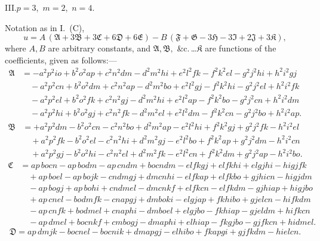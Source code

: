 \documentclass[11pt]{article}
\newcommand{\fA}{\mathfrak{A}}
\newcommand{\fB}{\mathfrak{B}}
\newcommand{\fC}{\mathfrak{C}}
\newcommand{\fD}{\mathfrak{D}}
\newcommand{\fE}{\mathfrak{E}}
\newcommand{\fF}{\mathfrak{F}}
\newcommand{\fG}{\mathfrak{G}}
\newcommand{\fH}{\mathfrak{H}}
\newcommand{\fI}{\mathfrak{I}}
\newcommand{\fJ}{\mathfrak{J}}
\newcommand{\fK}{\mathfrak{K}}
\begin{document}
\bigskip
III.\quad $p=3$,\ $m=2$,\ $n=4$.

Notation as in I.~(C),
\[
u = A\,(\fA + 3\fB + 3\fC + 6\fD + 6\fE) - B\,(\fF + \fG - 3\fH - 3\fI + 2\fJ + 3\fK),
\]
where $A, B$ are arbitrary constants, and $\fA, \fB,$ \&c.\,\ldots $\fK$ are functions of the coefficients,
given as follows:---
\[
\begin{aligned}
\fA &= -a^2 p^2 io + b^2 o^2 ap + c^2 n^2 dm - d^2 m^2 hi + e^2 l^2 fk - f^2 k^2 el - g^2 j^2 hi + h^2 i^2 gj\\
&\quad - a^2 p^2 cn + b^2 o^2 dm + c^2 n^2 ap - d^2 m^2 bo + e^2 l^2 gj - f^2 k^2 hi - g^2 j^2 el + h^2 i^2 fk\\
&\quad - a^2 p^2 el + b^2 o^2 fk + c^2 n^2 gj - d^2 m^2 hi + e^2 l^2 ap - f^2 k^2 bo - g^2 j^2 cn + h^2 i^2 dm\\
&\quad - a^2 p^2 hi + b^2 o^2 gj + c^2 n^2 fk - d^2 m^2 el + e^2 l^2 dm - f^2 k^2 cn - g^2 j^2 bo + h^2 i^2 ap.
\end{aligned}
\]
\[
\begin{aligned}
\fB &= +a^2 p^2 dm - b^2 o^2 cn - c^2 n^2 bo + d^2 m^2 ap - e^2 l^2 hi + f^2 k^2 gj + g^2 j^2 fk - h^2 i^2 el\\
&\quad + a^2 p^2 fk - b^2 o^2 el - c^2 n^2 hi + d^2 m^2 gj - e^2 l^2 bo + f^2 k^2 ap + g^2 j^2 dm - h^2 i^2 cn\\
&\quad + a^2 p^2 gj - b^2 o^2 hi - c^2 n^2 el + d^2 m^2 fk - e^2 l^2 cn + f^2 k^2 dm + g^2 j^2 ap - h^2 i^2 bo.
\end{aligned}
\]
\[
\begin{aligned}
\fC &= ap\,bocn - ap\,bodm - ap\,cndm + bocndm - elfkgj + elfkhi + elgjhi - higjfk\\
&\quad + ap\,boel - ap\,bojk - cndmgj + dmcnhi - elfkap + elfkbo + gjhicn - higjdm\\
&\quad - ap\,bogj + ap\,bohi + cndmel - dmcnkf + elfkcn - elfkdm - gjhiap + higjbo\\
&\quad + ap\,cnel - bodmfk - cnapgj + dmboki - elgjap + fkhibo + gjelcn - hifkdm\\
&\quad - ap\,cnfk + bodmel + cnaphi - dmboel + elgjbo - fkhiap - gjeldm + hifkcn\\
&\quad - ap\,dmel + bocnkf + cmbogj - dmaphi + elhiap - fkgjbo - gjfkcn + hidmel.
\end{aligned}
\]
\[
\fD = ap\,dmjk - bocnel - bocnik + dmapgj - elhibo + fkapgi + gjfkdm - hielcn.
\]
\end{document}
